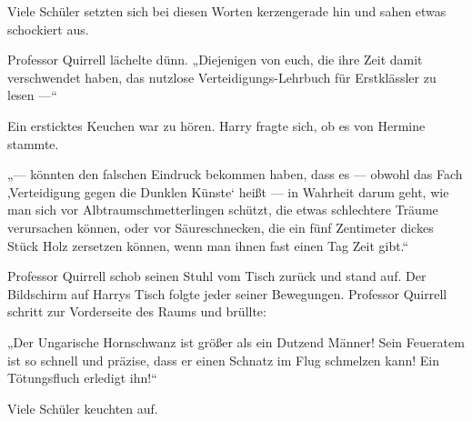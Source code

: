 Viele Schüler setzten sich bei diesen Worten kerzengerade hin und sahen etwas schockiert aus.

Professor Quirrell lächelte dünn.
„Diejenigen von euch, die ihre Zeit damit verschwendet haben, das nutzlose Verteidigungs-Lehrbuch für Erstklässler zu lesen —“

Ein ersticktes Keuchen war zu hören. Harry fragte sich, ob es von Hermine stammte.

„— könnten den falschen Eindruck bekommen haben, dass es — obwohl das Fach ‚Verteidigung gegen die Dunklen Künste‘ heißt — in Wahrheit darum geht, wie man sich vor Albtraumschmetterlingen schützt, die etwas schlechtere Träume verursachen können, oder vor Säureschnecken, die ein fünf Zentimeter dickes Stück Holz zersetzen können, wenn man ihnen fast einen Tag Zeit gibt.“

Professor Quirrell schob seinen Stuhl vom Tisch zurück und stand auf. Der Bildschirm auf Harrys Tisch folgte jeder seiner Bewegungen. Professor Quirrell schritt zur Vorderseite des Raums und brüllte:

„Der Ungarische Hornschwanz ist größer als ein Dutzend Männer! Sein Feueratem ist so schnell und präzise, dass er einen Schnatz im Flug schmelzen kann! Ein Tötungsfluch erledigt ihn!“

Viele Schüler keuchten auf.

